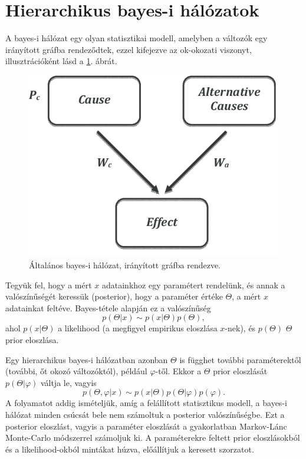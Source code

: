 \documentclass[12pt]{article}
\theoremstyle{plain}
\begin{document}
\section{Hierarchikus bayes-i hálózatok}
A bayes-i hálózat egy olyan statisztikai modell, amelyben a változók egy irányított gráfba rendeződtek, ezzel kifejezve az ok-okozati viszonyt, illusztrációként lásd a \ref{fig:2}. ábrát.  
\begin{figure}[h!]
    \centering
    \includegraphics{media/bayes.png}
    \caption{Általános bayes-i hálózat, irányított gráfba rendezve.}
    \label{fig:2}
\end{figure}
Tegyük fel, hogy a mért $x$ adatainkhoz egy paramétert rendelünk, és annak a valószínűségét keressük (posterior), hogy a paraméter értéke $\Theta$, a mért $x$ adatainkat feltéve. Bayes-tétele alapján ez a valószínűség
\begin{equation}
    \label{bayes}
    p(\Theta | x) \sim p(x | \Theta) p(\Theta),
\end{equation}
ahol $p(x|\Theta)$ a likelihood (a megfigyel empirikus eloszlása $x$-nek),  és $p(\Theta)$ $\Theta$ prior eloszlása. 

Egy hierarchikus bayes-i hálózatban azonban $\Theta$ is függhet további paraméterektől (további, őt okozó változóktól), például $\varphi$-től. Ekkor a $\Theta$ prior eloszlását $p(\Theta | \varphi)$ váltja le, vagyis
\begin{equation}
    p(\Theta, \varphi | x) \sim p(x | \Theta) p(\Theta | \varphi ) p(\varphi). 
\end{equation}
A folyamatot addig ismételjük, amíg a felállított statisztikus modell, a bayes-i hálózat minden csúcsát bele nem számoltuk a posterior valószínűségbe. Ezt a posterior eloszlást, vagyis a paraméter eloszlását a gyakorlatban Markov-Lánc Monte-Carlo módszerrel számoljuk ki. A paraméterekre feltett prior eloszlásokból és a likelihood-okból mintákat húzva, előállítjuk a keresett szorzatot. 


\end{document}
